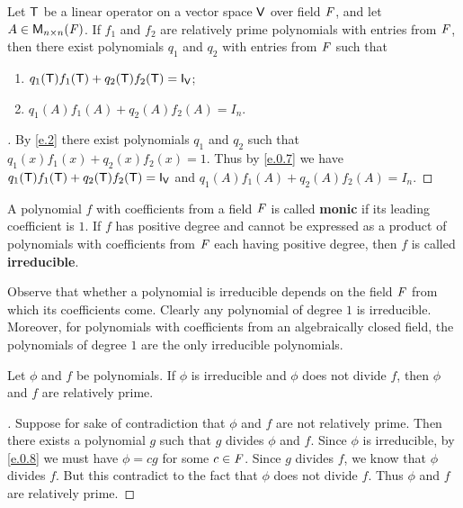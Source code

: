\begin{thm}\label{e.5}
	Let \(\mathsf{T}\) be a linear operator on a vector space \(\mathsf{V}\) over field \(\mathit{F}\), and let \(A \in \ms[n][n][\F]\).
	If \(f_1\) and \(f_2\) are relatively prime polynomials with entries from \(\mathit{F}\), then there exist polynomials \(q_1\) and \(q_2\) with entries from \(\mathit{F}\) such that
	\begin{enumerate}
		\item \(q_1(\T) f_1(\T) + q_2(\T) f_2(\T) = \IT[\V]\);
		\item \(q_1(A) f_1(A) + q_2(A) f_2(A) = I_n\).
	\end{enumerate}
\end{thm}

\begin{proof}[]
	By \cref{e.2} there exist polynomials \(q_1\) and \(q_2\) such that \(q_1(x) f_1(x) + q_2(x) f_2(x) = 1\).
	Thus by \cref{e.0.7} we have \(q_1(\T) f_1(\T) + q_2(\T) f_2(\T) = \IT[\V]\) and \(q_1(A) f_1(A) + q_2(A) f_2(A) = I_n\).
\end{proof}

\begin{defn}\label{e.0.8}
	A polynomial \(f\) with coefficients from a field \(\mathit{F}\) is called \textbf{monic} if its leading coefficient is \(1\).
	If \(f\) has positive degree and cannot be expressed as a product of polynomials with coefficients from \(\mathit{F}\) each having positive degree, then \(f\) is called \textbf{irreducible}.

	Observe that whether a polynomial is irreducible depends on the field \(\mathit{F}\) from which its coefficients come.
	Clearly any polynomial of degree \(1\) is irreducible.
	Moreover, for polynomials with coefficients from an algebraically closed field, the polynomials of degree \(1\) are the only irreducible polynomials.
\end{defn}

\begin{thm}\label{e.6}
	Let \(\phi\) and \(f\) be polynomials.
	If \(\phi\) is irreducible and \(\phi\) does not divide \(f\), then \(\phi\) and \(f\) are relatively prime.
\end{thm}

\begin{proof}[]
	Suppose for sake of contradiction that \(\phi\) and \(f\) are not relatively prime.
	Then there exists a polynomial \(g\) such that \(g\) divides \(\phi\) and \(f\).
	Since \(\phi\) is irreducible, by \cref{e.0.8} we must have \(\phi = cg\) for some \(c \in \mathit{F}\).
	Since \(g\) divides \(f\), we know that \(\phi\) divides \(f\).
	But this contradict to the fact that \(\phi\) does not divide \(f\).
	Thus \(\phi\) and \(f\) are relatively prime.
\end{proof}

